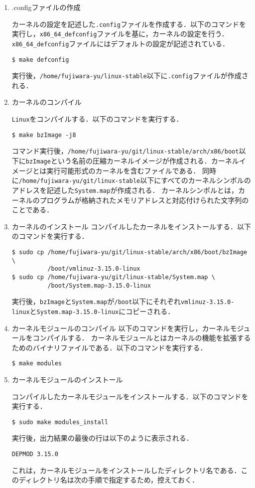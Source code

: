 \documentclass[12pt]{jsarticle}
\begin{document}
\begin{enumerate}
\item .configファイルの作成

カーネルの設定を記述した\verb|.config|ファイルを作成する．以下のコマンドを実行し，\verb|x86_64_defconfig|ファイルを基に，カーネルの設定を行う．\verb|x86_64_defconfig|ファイルにはデフォルトの設定が記述されている．
\begin{verbatim}
$ make defconfig
\end{verbatim}
実行後，\verb|/home/fujiwara-yu/linux-stable|以下に\verb|.config|ファイルが作成される．

\item カーネルのコンパイル

\verb|Linux|をコンパイルする．以下のコマンドを実行する．
\begin{verbatim}
$ make bzImage -j8
\end{verbatim}
コマンド実行後，\verb|/home/fujiwara-yu/git/linux-stable/arch/x86/boot|以下に\verb|bzImage|という名前の圧縮カーネルイメージが作成される．カーネルイメージとは実行可能形式のカーネルを含むファイルである．
同時に\verb|/home/fujiwara-yu/git/linux-stable|以下にすべてのカーネルシンボルのアドレスを記述した\verb|System.map|が作成される．
カーネルシンボルとは，カーネルのプログラムが格納されたメモリアドレスと対応付けられた文字列のことである．

\item カーネルのインストール
コンパイルしたカーネルをインストールする．以下のコマンドを実行する．
\begin{verbatim}
$ sudo cp /home/fujiwara-yu/git/linux-stable/arch/x86/boot/bzImage \
          /boot/vmlinuz-3.15.0-linux
$ sudo cp /home/fujiwara-yu/git/linux-stable/System.map \
          /boot/System.map-3.15.0-linux
\end{verbatim}
実行後，\verb|bzImage|と\verb|System.map|が\verb|/boot|以下にそれぞれ\verb|vmlinuz-3.15.0-linux|と\verb|System.map-3.15.0-linux|にコピーされる．

\item カーネルモジュールのコンパイル
以下のコマンドを実行し，カーネルモジュールをコンパイルする．
カーネルモジュールとはカーネルの機能を拡張するためのバイナリファイルである．以下のコマンドを実行する．
\begin{verbatim}
$ make modules
\end{verbatim}

\item カーネルモジュールのインストール

コンパイルしたカーネルモジュールをインストールする．以下のコマンドを実行する．
\begin{verbatim}
$ sudo make modules_install
\end{verbatim}
実行後，出力結果の最後の行は以下のように表示される．
\begin{verbatim}
DEPMOD 3.15.0
\end{verbatim}
これは，カーネルモジュールをインストールしたディレクトリ名である．このディレクトリ名は次の手順で指定するため，控えておく．


\end{enumerate}
\end{document}
